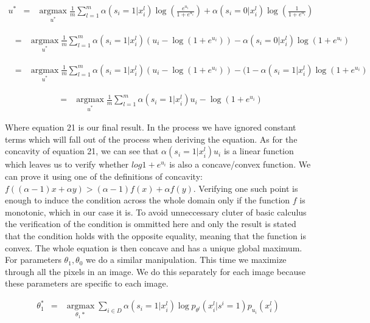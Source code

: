 \documentclass[11pt]{article}
\DeclareMathOperator*{\argmax}{argmax}
\begin{document}
\begin{eqnarray}
u^* &=& \argmax\limits_{u^*} \frac{1}{m}\sum_{l=1}^m \alpha(s_i = 1 | x_i^l) \log (\frac{e^{u_i}}{1 + e^{u_i}}) + \alpha(s_i = 0 | x_i^l) \log (\frac{1}{1 + e^{u_i}})
\end{eqnarray}

\begin{eqnarray}
 &=& \argmax\limits_{u^*} \frac{1}{m}\sum_{l=1}^m \alpha(s_i = 1 | x_i^l)(u_i - \log (1 + e^{u_i})) - \alpha(s_i = 0 | x_i^l) \log (1 + e^{u_i})
\end{eqnarray}

\begin{eqnarray}
 &=& \argmax\limits_{u^*} \frac{1}{m}\sum_{l=1}^m \alpha(s_i = 1 | x_i^l)(u_i - \log (1 + e^{u_i})) - (1 - \alpha(s_i = 1 | x_i^l) \log (1 + e^{u_i})
\end{eqnarray}

\begin{eqnarray}
 &=& \argmax\limits_{u^*} \frac{1}{m}\sum_{l=1}^m \alpha(s_i = 1 | x_i^l)u_i - \log (1 + e^{u_i})
\end{eqnarray}

Where equation 21 is our final result. In the process we have ignored constant terms which will fall out of the process when deriving the equation. As for the concavity of equation 21, we can see that 
$\alpha(s_i = 1 | x_i^l)u_i$ is a linear function which leaves us to verify whether $log{1 + e^{u_i}}$
is also a concave/convex function.  We can prove it using one of the definitions of concavity: $f((\alpha - 1)x + \alpha y) >  (\alpha - 1)f(x) + \alpha f(y) $. Verifying one such point is enough to induce the condition across the whole domain only if the function $f$ is monotonic, which in our case it is. To avoid unneccessary cluter of basic calculus the verification of the condition is ommitted here and only the result is stated that the condition holds with the opposite equality, meaning that the function is convex. The whole equation is then concave and has a unique global maximum. \\


For parameters $\theta_1,\theta_0$ we do a similar manipulation. This time we maximize through all the pixels in an image. We do this separately for each image because these parameters are specific to each image.

\begin{eqnarray}
\theta_1^* &=& \argmax\limits_{\theta_1*} \sum_{ i \in D} \alpha(s_i = 1 | x_i^l) \log p_{\theta^l}(x_i^l|s^i = 1) p_{u_i}(x_i^l) 
\end{eqnarray}
\end{document}
